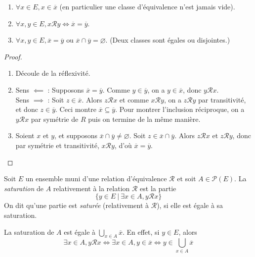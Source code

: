 \begin{proposition}
\begin{enumerate}
\item $\forall x\in E, x\in \overline{x}$ (en particulier une classe d'équivalence n'est jamais vide).
\item $\forall x, y\in E, x{\mathcal R}y \iff \overline{x}=\overline{y}$.
\item $\forall x, y\in E, \overline{x} = \overline{y} \text{ ou } \overline{x}\cap \overline{y}=\varnothing$. (Deux classes sont égales ou disjointes.)
\end{enumerate}
\end{proposition}
\begin{proof}
\begin{enumerate}
\item Découle de la réflexivité.
\item Sens $\impliedby$ : Supposons $\overline{x}=\overline{y}$. Comme $y\in \overline{y}$, on a $y\in \overline{x}$, donc $y{\mathcal R}x$.\\
Sens $\implies$ : Soit $z\in \overline{x}$. Alors $z{\mathcal R}x$ et comme $x{\mathcal R}y$, on a $z{\mathcal R}y$ par transitivité, et donc $z\in \overline{y}$. Ceci montre $\overline{x}\subseteq \overline{y}$. Pour montrer l'inclusion réciproque, on a $y{\mathcal R}x$ par symétrie de $R$ puis on termine de la même manière.
\item Soient $x$ et $y$, et supposons $\overline{x}\cap \overline{y} \neq \varnothing$. Soit $z\in \overline{x}\cap \overline{y}$. Alors $z\mathcal R x$ et $z\mathcal R y$, donc par symétrie et transitivité, $x\mathcal R y$, d'où $\overline{x}=\overline{y}$.
\end{enumerate}
\end{proof}

\begin{definition}
Soit $E$ un ensemble muni d'une relation d'équivalence ${\mathcal R}$ et soit $A\in \mathcal P(E)$. La \emph{saturation} de $A$ relativement à la relation $\mathcal R$ est la partie
\[
\{y\in E\:|\: \exists x\in A, y\mathcal R x\} 
\]
On dit qu'une partie est \emph{saturée} (relativement à $\mathcal R$), si elle est égale à sa saturation.
\end{definition}

\begin{remarque} La saturation de $A$ est égale à $\bigcup_{x\in A} \overline x$. En effet, si $y\in E$, alors 
\[
\exists x\in A, y\mathcal R x
\iff \exists x\in A, y\in \overline x
\iff y\in \bigcup_{x\in A} \overline x 
\]
\end{remarque}

